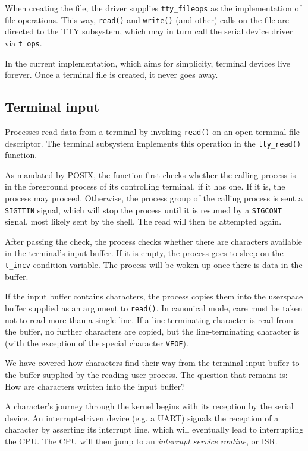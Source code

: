 \documentclass[shortabstract, manyadvisors, english, mgr]{iithesis}
\begin{document}
When creating the file, the driver supplies \texttt{tty\_fileops} as the
implementation of file operations. This way, \texttt{read()} and
\texttt{write()} (and other) calls on the file are directed to the TTY
subsystem, which may in turn call the serial device driver via \texttt{t\_ops}.

In the current implementation, which aims for simplicity, terminal devices live
forever. Once a terminal file is created, it never goes away.

\subsection{Terminal input}

Processes read data from a terminal by invoking \texttt{read()} on an open
terminal file descriptor. The terminal subsystem implements this operation in
the \texttt{tty\_read()} function.

As mandated by POSIX, the function first checks whether the calling process is
in the foreground process of its controlling terminal, if it has one. If it is,
the process may proceed. Otherwise, the process group of the calling process is
sent a \texttt{SIGTTIN} signal, which will stop the process until it is
resumed by a \texttt{SIGCONT} signal, most likely sent by the shell. The read
will then be attempted again.

After passing the check, the process checks whether there are characters
available in the terminal's input buffer. If it is empty, the process goes to
sleep on the \texttt{t\_incv} condition variable. The process will be woken up
once there is data in the buffer.

If the input buffer contains characters, the process copies them into the
userspace buffer supplied as an argument to \texttt{read()}. In canonical mode,
care must be taken not to read more than a single line. If a line-terminating
character is read from the buffer, no further characters are copied, but the
line-terminating character is (with the exception of the special character
\texttt{VEOF}).

We have covered how characters find their way from the terminal input buffer to
the buffer supplied by the reading user process. The question that remains is:
How are characters written into the input buffer?

A character's journey through the kernel begins with its reception by the
serial device. An interrupt-driven device (e.g. a UART) signals the reception of
a character by asserting its interrupt line, which will eventually lead to
interrupting the CPU. The CPU will then jump to an \textit{interrupt service
  routine}, or ISR.
\end{document}
